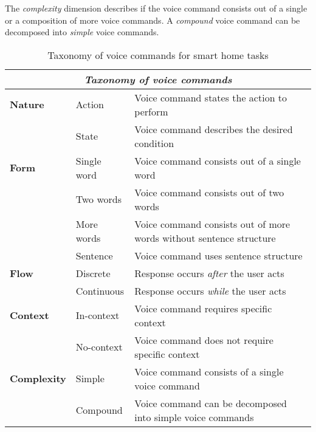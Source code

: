 \documentclass[sigchi]{acmart}
\begin{document}
The \textit{complexity} dimension describes if the voice command consists out of a single or a composition of more voice commands. A \textit{compound} voice command can be decomposed into \textit{simple} voice commands.
\begin{table}[t]
\begin{center}
\caption{Taxonomy of voice commands for smart home tasks}
\label{tab:taxVoice}
\begin{small}
\begin{tabular}{p{} p{} p{}} \toprule
\multicolumn{3}{c}{\textit{Taxonomy of voice commands}} \\ \midrule
\textbf{Nature}		& Action		& Voice command states the action to perform \\
					& State			& Voice command describes the desired condition \\ \midrule
\textbf{Form} 		& Single word	& Voice command consists out of a single word \\
					& Two words		& Voice command consists out of two words \\
					& More words	& Voice command consists out of more words without sentence structure \\
					& Sentence		& Voice command uses sentence structure \\ \midrule
\textbf{Flow}		& Discrete		& Response occurs \textit{after} the user acts \\ 
					& Continuous 	& Response occurs \textit{while} the user acts  \\ \midrule
\textbf{Context}	& In-context	& Voice command requires specific context \\
					& No-context	& Voice command does not require specific context \\ \midrule
\textbf{Complexity}	& Simple		& Voice command consists of a single voice command \\
					& Compound		& Voice command can be decomposed into simple voice commands  \\ \bottomrule
\end{tabular}
\end{small}
\end{center}
\end{table}
\end{document}
